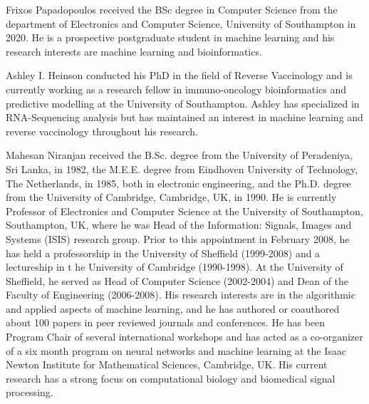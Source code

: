 \documentclass[10pt,journal,compsoc,twoside]{IEEEtran}
\begin{document}
% 

\begin{IEEEbiography}{Frixos Papadopoulos}
received the BSc degree in Computer Science from the department of Electronics and Computer Science, University of Southampton in 2020. He is a prospective postgraduate student in machine learning and his research interests are machine learning and bioinformatics.
\end{IEEEbiography}

\begin{IEEEbiography}{Ashley I. Heinson}
conducted his PhD in the field of Reverse Vaccinology and is currently working as a research fellow in immuno-oncology bioinformatics and predictive modelling at the University of Southampton. Ashley has specialized in RNA-Sequencing analysis but has maintained an interest in machine learning and reverse vaccinology throughout his research.
\end{IEEEbiography}

\begin{IEEEbiography}{Mahesan Niranjan}
received the B.Sc. degree from the University of Peradeniya, Sri Lanka, in 1982, the M.E.E. degree from Eindhoven University of Technology, The Netherlands, in 1985, both in electronic engineering, and the Ph.D. degree from the University of Cambridge, Cambridge, UK, in 1990. He is currently Professor of Electronics and Computer Science at the University of Southampton, Southampton, UK, where he was Head of the Information: Signals, Images and Systems (ISIS) research group. Prior to this appointment in February 2008, he has held a professorship in the University of Sheffield (1999-2008) and a lectureship in t he University of Cambridge (1990-1998). At the University of Sheffield, he served as Head of Computer Science (2002-2004) and Dean of the Faculty of Engineering (2006-2008). His research interests are in the algorithmic and applied aspects of machine learning, and he has authored or coauthored about 100 papers in peer reviewed journals and conferences. He has been Program Chair of several international workshops and has acted as a co-organizer of a six month program on neural networks and machine learning at the Isaac Newton Institute for Mathematical Sciences, Cambridge, UK. His current research has a strong focus on computational biology and biomedical signal processing.
\end{IEEEbiography}
\end{document}
